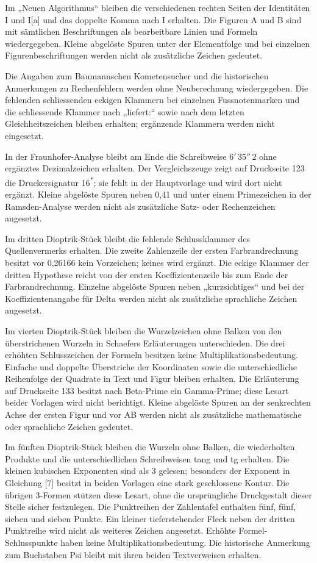 Im „Neuen Algorithmus“ bleiben die verschiedenen rechten Seiten der Identitäten I und I[a] und das doppelte Komma nach I erhalten. Die Figuren A und B sind mit sämtlichen Beschriftungen als bearbeitbare Linien und Formeln wiedergegeben. Kleine abgelöste Spuren unter der Elementfolge und bei einzelnen Figurenbeschriftungen werden nicht als zusätzliche Zeichen gedeutet.

Die Angaben zum Baumannschen Kometensucher und die historischen Anmerkungen zu Rechenfehlern werden ohne Neuberechnung wiedergegeben. Die fehlenden schliessenden eckigen Klammern bei einzelnen Fussnotenmarken und die schliessende Klammer nach „liefert:“ sowie nach dem letzten Gleichheitszeichen bleiben erhalten; ergänzende Klammern werden nicht eingesetzt.

In der Fraunhofer-Analyse bleibt am Ende die Schreibweise $6'\,35''\,2$ ohne ergänztes Dezimalzeichen erhalten. Der Vergleichszeuge zeigt auf Druckseite 123 die Druckersignatur 16\textsuperscript{*}; sie fehlt in der Hauptvorlage und wird dort nicht ergänzt. Kleine abgelöste Spuren neben 0,41 und unter einem Primezeichen in der Ramsden-Analyse werden nicht als zusätzliche Satz- oder Rechenzeichen angesetzt.

Im dritten Dioptrik-Stück bleibt die fehlende Schlussklammer des Quellenvermerks erhalten. Die zweite Zahlenzeile der ersten Farbrandrechnung besitzt vor 0,26166 kein Vorzeichen; keines wird ergänzt. Die eckige Klammer der dritten Hypothese reicht von der ersten Koeffizientenzeile bis zum Ende der Farbrandrechnung. Einzelne abgelöste Spuren neben „kurzsichtiges“ und bei der Koeffizientenangabe für Delta werden nicht als zusätzliche sprachliche Zeichen angesetzt.

Im vierten Dioptrik-Stück bleiben die Wurzelzeichen ohne Balken von den überstrichenen Wurzeln in Schaefers Erläuterungen unterschieden. Die drei erhöhten Schlusszeichen der Formeln besitzen keine Multiplikationsbedeutung. Einfache und doppelte Überstriche der Koordinaten sowie die unterschiedliche Reihenfolge der Quadrate in Text und Figur bleiben erhalten. Die Erläuterung auf Druckseite 133 besitzt nach Beta-Prime ein Gamma-Prime; diese Lesart beider Vorlagen wird nicht berichtigt. Kleine abgelöste Spuren an der senkrechten Achse der ersten Figur und vor AB werden nicht als zusätzliche mathematische oder sprachliche Zeichen gedeutet.

Im fünften Dioptrik-Stück bleiben die Wurzeln ohne Balken, die wiederholten Produkte und die unterschiedlichen Schreibweisen tang und tg erhalten. Die kleinen kubischen Exponenten sind als 3 gelesen; besonders der Exponent in Gleichung [7] besitzt in beiden Vorlagen eine stark geschlossene Kontur. Die übrigen 3-Formen stützen diese Lesart, ohne die ursprüngliche Druckgestalt dieser Stelle sicher festzulegen. Die Punktreihen der Zahlentafel enthalten fünf, fünf, sieben und sieben Punkte. Ein kleiner tieferstehender Fleck neben der dritten Punktreihe wird nicht als weiteres Zeichen angesetzt. Erhöhte Formel-Schlusspunkte haben keine Multiplikationsbedeutung. Die historische Anmerkung zum Buchstaben Psi bleibt mit ihren beiden Textverweisen erhalten.

